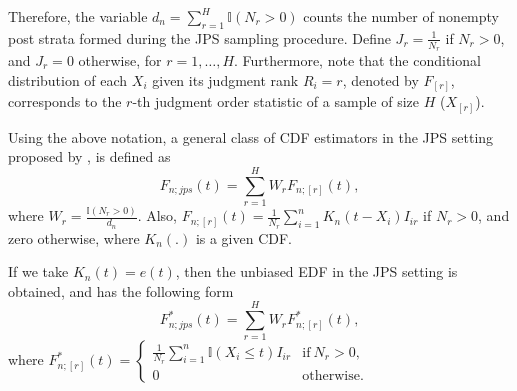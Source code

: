 \documentclass[twoside]{article}
\begin{document}
Therefore, the variable \(d_n = \sum_{r=1}^{H} \mathbb{I}(N_r > 0)\) counts the number of nonempty post strata formed during the JPS sampling procedure.
Define \(J_r = \frac{1}{N_r}\) if \(N_r > 0\), and \(J_r = 0\) otherwise, for \(r = 1, \ldots, H\).
Furthermore, note that the conditional distribution of each \(X_i\) given its judgment rank \(R_i = r\), denoted by \(F_{[r]}\), corresponds to the \(r\)-th judgment order statistic of a sample of size \(H\) (\(X_{[r]}\)).

Using the above notation, a general class of CDF estimators in the JPS setting  
proposed by \cite{kouhanestani2025statistical},
is defined as
\begin{equation} \label{Fjps}
F_{n;jps}(t) = \sum\limits_{r = {1}}^H {{W_{r}}}  {{F}}_{n;[r]} (t),
\end{equation} 
where $ W_r=\frac{\mathbb{I}(N_r>0)}{d_n}$. Also,
${{F}}_{n;[r]} (t)=\frac{1}{N_r}\sum \limits_{i=1}^n K_n\left(t-X_i\right)I_{ir}$ if $N_r>0$, and zero otherwise, where  $K_n\left(.\right)$ is a given CDF.

If we take $K_n\left(t\right)=e(t)$, then the unbiased EDF in the JPS setting is obtained, and has the following form
\begin{equation*} 
F_{n;jps}^*(t) = \sum\limits_{r = {1}}^H {{W_{r}}}  {{F}}_{n;[r]}^* (t),\label{eq1j} 
\end{equation*} 
where 
$
{{F}}_{n;[r]}^* (t)=
\begin{cases}
\frac{1}{N_r}\sum \limits_{i=1}^n \mathbb{I}\left(X_i\leq t\right)I_{ir}  &   \text{if} \ N_r>0,
\\
0 & \text{otherwise.}
\end{cases}
$
\end{document}
